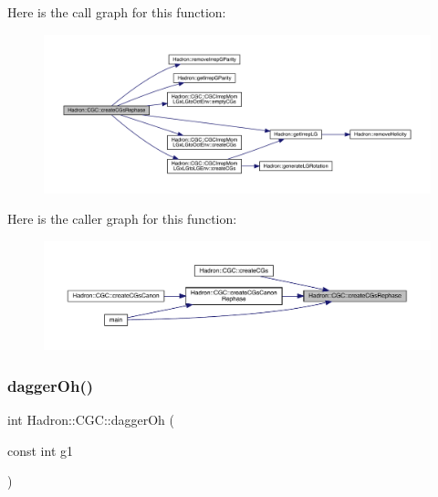 Here is the call graph for this function\+:\nopagebreak
\begin{figure}[H]
\begin{center}
\leavevmode
\includegraphics[width=350pt]{d9/d19/namespaceHadron_1_1CGC_acb590dcbf6bd9f515f07a8e64aa76c0b_cgraph}
\end{center}
\end{figure}
Here is the caller graph for this function\+:\nopagebreak
\begin{figure}[H]
\begin{center}
\leavevmode
\includegraphics[width=350pt]{d9/d19/namespaceHadron_1_1CGC_acb590dcbf6bd9f515f07a8e64aa76c0b_icgraph}
\end{center}
\end{figure}
\mbox{\label{namespaceHadron_1_1CGC_a90d3161b56ca289f2c3f62fa91923dac}} 
\subsubsection{\texorpdfstring{daggerOh()}{daggerOh()}}
{\footnotesize\ttfamily int Hadron\+::\+C\+G\+C\+::dagger\+Oh (\begin{DoxyParamCaption}\item[{const int}]{g1 }\end{DoxyParamCaption})}

